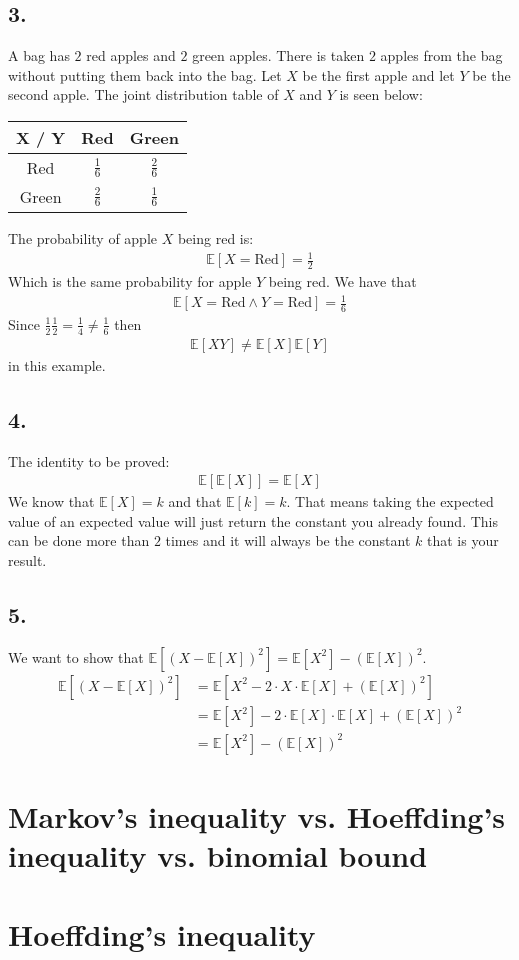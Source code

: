\documentclass[a4paper]{article}
\def\E{\mathbb{E}}
\begin{document}
\subsection*{3.}
A bag has $2$ red apples and $2$ green apples. There is taken $2$ apples from the bag without putting them back into the bag. Let $X$ be the first apple and let $Y$ be the second apple. The joint distribution table of $X$ and $Y$ is seen below:
\begin{center}
\begin{tabular}{|c||c|c|}
\hline
X / Y & Red & Green \\
\hline
\hline
Red & $\frac{1}{6}$  & $\frac{2}{6}$ \\
\hline
Green & $\frac{2}{6}$ & $\frac{1}{6}$\\
\hline
\end{tabular}
\end{center}
The probability of apple $X$ being red is:
\begin{align*}
\mathbb{E}[X=\mbox{Red}] = \frac{1}{2}
\end{align*}
Which is the same probability for apple $Y$ being red. We have that
\begin{align*}
\mathbb{E}[X=\mbox{Red} \land Y=\mbox{Red}]=\frac{1}{6}
\end{align*}
Since $\frac{1}{2}\frac{1}{2} = \frac{1}{4}\neq\frac{1}{6}$ then
\begin{align*}
\mathbb{E}[XY]\neq \mathbb{E}[X]\mathbb{E}[Y]
\end{align*}
in this example.

\subsection*{4.}
The identity to be proved:
\begin{align*}
\mathbb{E}[\mathbb{E}[X]]=\mathbb{E}[X]
\end{align*}
We know that $\mathbb{E}[X]=k$ and that $\mathbb{E}[k]=k$. That means taking the expected value of an expected value will just return the constant you already found. This can be done more than $2$ times and it will always be the constant $k$ that is your result.

\subsection*{5.}
We want to show that $\E[(X-\E[X])^2] = \E[X^2]-(\E[X])^2.$
\begin{align*}
  \E[(X-\E[X])^2] &= \E[X^2 - 2\cdot X \cdot \E[X]+ (\E[X])^2]\\
                  &= \E[X^2] - 2\cdot \E[X] \cdot \E[X] + (\E[X])^2\\
                  &= \E[X^2]-(\E[X])^2
\end{align*}
\section{Markov's inequality vs. Hoeffding's inequality vs. binomial bound}

\section{Hoeffding's inequality}
\end{document}

